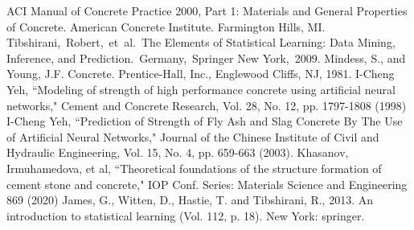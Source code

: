 \documentclass[conference]{IEEEtran}
\begin{document}
\begin{thebibliography}{00}
 ACI Manual of Concrete Practice 2000, Part 1: Materials and General Properties of Concrete.  American Concrete Institute.  Farmington Hills, MI.
 Tibshirani, Robert, et al. The Elements of  Statistical Learning:  Data Mining, Inference, and Prediction. Germany, Springer New York, 2009.
 Mindess, S., and Young, J.F. Concrete. Prentice-Hall, Inc., Englewood Cliffs, NJ, 1981.
 I-Cheng Yeh, ``Modeling of strength of high performance concrete using artificial neural networks," Cement and Concrete Research, Vol. 28, No. 12, pp. 1797-1808 (1998)
 I-Cheng Yeh, ``Prediction of Strength of Fly Ash and Slag Concrete By The Use of Artificial Neural Networks," Journal of the Chinese Institute of Civil and Hydraulic Engineering, Vol. 15, No. 4, pp. 659-663 (2003). 
 Khasanov, Irmuhamedova, et al, ``Theoretical foundations of the structure formation of cement stone
and concrete," IOP Conf. Series: Materials Science and Engineering 869 (2020)
 James, G., Witten, D., Hastie, T. and Tibshirani, R., 2013. An introduction to statistical learning (Vol. 112, p. 18). New York: springer.

\end{thebibliography}
\end{document}
